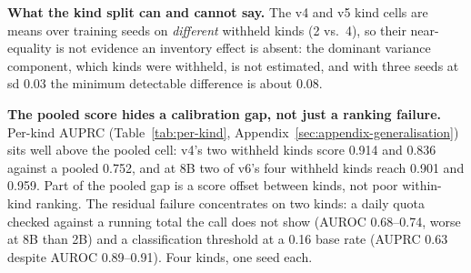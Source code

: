 \textbf{What the kind split can and cannot say.} The v4 and v5 kind cells are
means over training seeds on \emph{different} withheld kinds (2 vs.\ 4), so
their near-equality is not evidence an inventory effect is absent: the
dominant variance component, which kinds were withheld, is not estimated,
and with three seeds at sd 0.03 the minimum detectable difference is about
0.08.

\textbf{The pooled score hides a calibration gap, not just a ranking
failure.} Per-kind AUPRC (Table~\ref{tab:per-kind},
Appendix~\ref{sec:appendix-generalisation}) sits well above the pooled cell:
v4's two withheld kinds score
0.914 and 0.836 against a pooled 0.752, and at 8B two of v6's four withheld
kinds reach 0.901 and 0.959. Part of the pooled gap is a score offset
between kinds, not poor within-kind ranking. The residual failure
concentrates on two kinds: a daily quota checked against a running total the
call does not show (AUROC 0.68--0.74, worse at 8B than 2B) and a
classification threshold at a 0.16 base rate (AUPRC 0.63 despite AUROC
0.89--0.91). Four kinds, one seed each.

\FloatBarrier
